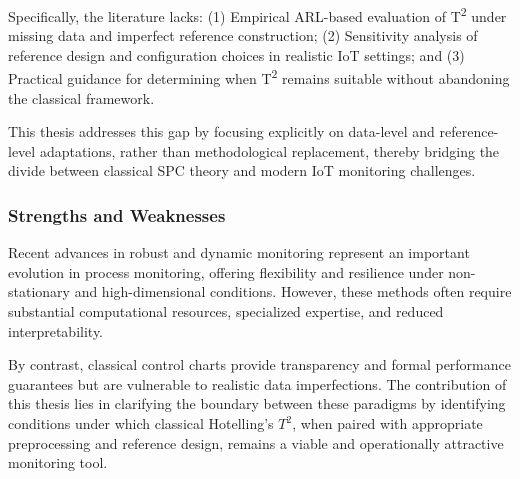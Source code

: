 Specifically, the literature lacks:
(1) Empirical \ac{ARL}-based evaluation of T\textsuperscript{2} under missing data and imperfect reference construction; (2) Sensitivity analysis of reference design and configuration choices in realistic \ac{IoT} settings; and (3) Practical guidance for determining when T\textsuperscript{2} remains suitable without abandoning the classical framework.

This thesis addresses this gap by focusing explicitly on data-level and reference-level adaptations, rather than methodological replacement, thereby bridging the divide between classical SPC theory and modern \ac{IoT} monitoring challenges.

\subsubsection{Strengths and Weaknesses}

Recent advances in robust and dynamic monitoring represent an important evolution in process monitoring, offering flexibility and resilience under non-stationary and high-dimensional conditions. However, these methods often require substantial computational resources, specialized expertise, and reduced interpretability.

By contrast, classical control charts provide transparency and formal performance guarantees but are vulnerable to realistic data imperfections. The contribution of this thesis lies in clarifying the boundary between these paradigms by identifying conditions under which classical Hotelling’s $T^2$, when paired with appropriate preprocessing and reference design, remains a viable and operationally attractive monitoring tool.
